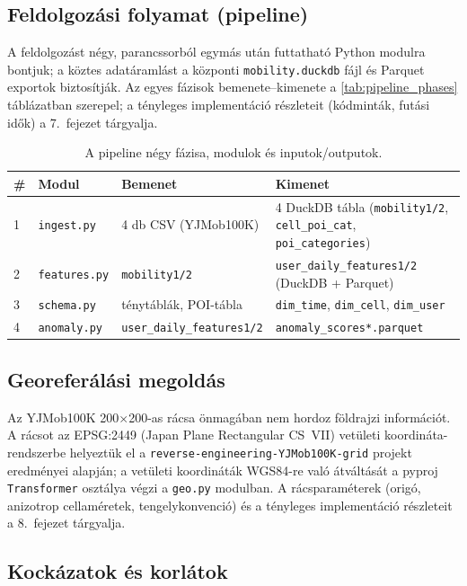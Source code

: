\subsection{Feldolgozási folyamat (pipeline)}

A feldolgozást négy, parancssorból egymás után futtatható Python modulra bontjuk; a köztes adatáramlást a központi \texttt{mobility.duckdb} fájl és Parquet exportok biztosítják. Az egyes fázisok bemenete--kimenete a \autoref{tab:pipeline_phases} táblázatban szerepel; a tényleges implementáció részleteit (kódminták, futási idők) a 7.\ fejezet tárgyalja.

\begin{table}[H]
\centering
\caption{A pipeline négy fázisa, modulok és inputok/outputok.}
\label{tab:pipeline_phases}
\begin{tabular}{l l p{4.5cm} p{4.5cm}}
\hline
\textbf{\#} & \textbf{Modul} & \textbf{Bemenet} & \textbf{Kimenet} \\
\hline
1 & \texttt{ingest.py}   & 4 db CSV (YJMob100K) & 4 DuckDB tábla (\texttt{mobility1/2}, \texttt{cell\_poi\_cat}, \texttt{poi\_categories}) \\
2 & \texttt{features.py} & \texttt{mobility1/2} & \texttt{user\_daily\_features1/2} (DuckDB + Parquet) \\
3 & \texttt{schema.py}   & ténytáblák, POI-tábla & \texttt{dim\_time}, \texttt{dim\_cell}, \texttt{dim\_user} \\
4 & \texttt{anomaly.py}  & \texttt{user\_daily\_features1/2} & \texttt{anomaly\_scores*.parquet} \\
\hline
\end{tabular}
\end{table}

\subsection{Georeferálási megoldás}

Az YJMob100K 200$\times$200-as rácsa önmagában nem hordoz földrajzi információt. A rácsot az EPSG:2449 (Japan Plane Rectangular CS~VII) vetületi koordináta-rendszerbe helyeztük el a \texttt{reverse-engineering-YJMob100K-grid} projekt \cite{pinter2024revealing} eredményei alapján; a vetületi koordináták WGS84-re való átváltását a pyproj \texttt{Transformer} osztálya végzi a \texttt{geo.py} modulban. A rácsparaméterek (origó, anizotrop cellaméretek, tengelykonvenció) és a tényleges implementáció részleteit a 8.\ fejezet tárgyalja.

\subsection{Kockázatok és korlátok}

